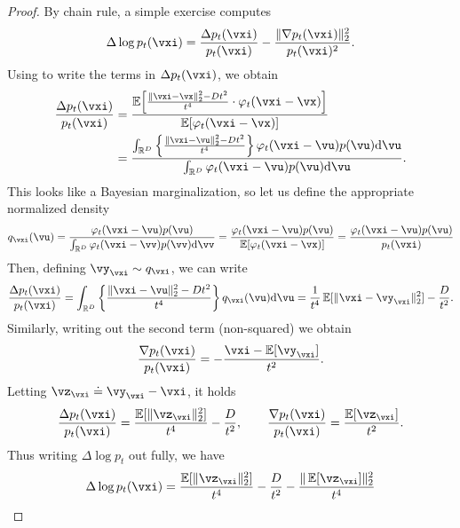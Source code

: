 \documentclass[../../book-main.tex]{subfiles}
\begin{document}
\begin{proof}
    By chain rule, a simple exercise computes 
    \begin{equation}
        \Delta \log p_{t}(\vxi) = \frac{\Delta p_{t}(\vxi)}{p_{t}(\vxi)} - \frac{\norm{\nabla p_{t}(\vxi)}_{2}^{2}}{p_{t}(\vxi)^{2}}.
    \end{equation}
    Using  to write the terms in \(\Delta p_{t}(\vxi)\), we obtain
    \begin{align}
        \frac{\Delta p_{t}(\vxi)}{p_{t}(\vxi)}
        &= \frac{\Ex\rs{\frac{\norm{\vxi - \vx}_{2}^{2} - Dt^{2}}{t^{4}} \cdot \phi_{t}(\vxi - \vx)}}{\Ex[\phi_{t}(\vxi - \vx)]} \\
        &= \frac{\int_{\R^{D}}\bc{\frac{\norm{\vxi - \vu}_{2}^{2} - Dt^{2}}{t^{4}}}\phi_{t}(\vxi - \vu)p(\vu)\odif{\vu}}{\int_{\R^{D}}\phi_{t}(\vxi - \vu)p(\vu)\odif{\vu}}.
    \end{align}
    This looks like a Bayesian marginalization, so let us define the appropriate normalized density
    \begin{equation}
        q_{\vxi}(\vu) = \frac{\phi_{t}(\vxi - \vu)p(\vu)}{\int_{\R^{D}}\phi_{t}(\vxi - \vv)p(\vv)\odif{\vv}} = \frac{\phi_{t}(\vxi - \vu)p(\vu)}{\Ex[\phi_{t}(\vxi - \vx)]} = \frac{\phi_{t}(\vxi - \vu)p(\vu)}{p_{t}(\vxi)}
    \end{equation}
    Then, defining \(\vy_{\vxi} \sim q_{\vxi}\), we can write 
    \begin{equation}
        \frac{\Delta p_{t}(\vxi)}{p_{t}(\vxi)} = \int_{\R^{D}}\bc{\frac{\norm{\vxi - \vu}_{2}^{2} - Dt^{2}}{t^{4}}}q_{\vxi}(\vu)\odif{\vu} = \frac{1}{t^{4}}\Ex[\norm{\vxi - \vy_{\vxi}}_{2}^{2}] - \frac{D}{t^{2}}.
    \end{equation}
    Similarly, writing out the second term (non-squared) we obtain
    \begin{equation}
        \frac{\nabla p_{t}(\vxi)}{p_{t}(\vxi)} = -\frac{\vxi - \Ex[\vy_{\vxi}]}{t^{2}}.
    \end{equation}
    Letting \(\vz_{\vxi} \doteq \vy_{\vxi} - \vxi\), it holds 
    \begin{equation}
        \frac{\Delta p_{t}(\vxi)}{p_{t}(\vxi)} = \frac{\Ex[\norm{\vz_{\vxi}}_{2}^{2}]}{t^{4}} - \frac{D}{t^{2}}, \qquad \frac{\nabla p_{t}(\vxi)}{p_{t}(\vxi)} = \frac{\Ex[\vz_{\vxi}]}{t^{2}}.
    \end{equation}
    Thus writing \(\Delta \log p_{t}\) out fully, we have 
    \begin{align}
        \Delta \log p_{t}(\vxi)
        &= \frac{\Ex[\norm{\vz_{\vxi}}_{2}^{2}]}{t^{4}} - \frac{D}{t^{2}} - \frac{\norm{\Ex[\vz_{\vxi}]}_{2}^{2}}{t^{4}} \\

\end{align}
\end{proof}
\end{document}
